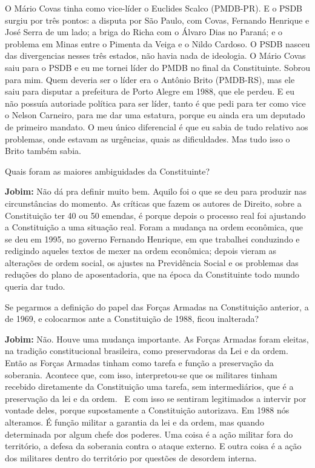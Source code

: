 O Mário Covas tinha como vice-líder o Euclides Scalco (PMDB-PR). E o
PSDB surgiu por três pontos: a disputa por São Paulo, com Covas,
Fernando Henrique e José Serra de um lado; a briga do Richa com o Álvaro
Dias no Paraná; e o problema em Minas entre o Pimenta da Veiga e o Nildo
Cardoso. O PSDB nasceu das divergencias nesses três estados, não havia
nada de ideologia. O Mário Covas saiu para o PSDB e eu me tornei líder
do PMDB no final da Constituinte. Sobrou para mim. Quem deveria ser o
líder era o Antônio Brito (PMDB-RS), mas ele saiu para disputar a
prefeitura de Porto Alegre em 1988, que ele perdeu. E eu não possuía
autoriade política para ser líder, tanto é que pedi para ter como vice o
Nelson Carneiro, para me dar uma estatura, porque eu ainda era um
deputado de primeiro mandato. O meu único diferencial é que eu sabia de
tudo relativo aos problemas, onde estavam as urgências, quais as
dificuldades. Mas tudo isso o Brito também sabia.

Quais foram as maiores ambiguidades da Constituinte?

\textbf{Jobim:} Não dá pra definir muito bem. Aquilo foi o que se deu
para produzir nas circunstâncias do momento. As críticas que fazem os
autores de Direito, sobre a Constituição ter 40 ou 50 emendas, é porque
depois o processo real foi ajustando a Constituição a uma situação real.
Foram a mudança na ordem econômica, que se deu em 1995, no governo
Fernando Henrique, em que trabalhei conduzindo e redigindo aqueles
textos de mexer na ordem econômica; depois vieram as alterações de ordem
social, os ajustes na Previdência Social e os problemas das reduções do
plano de aposentadoria, que na época da Constituinte todo mundo queria
dar tudo.

Se pegarmos a definição do papel das Forças Armadas na Constituição
anterior, a de 1969, e colocarmos ante a Constituição de 1988, ficou
inalterada?

\textbf{Jobim:} Não. Houve uma mudança importante. As Forças Armadas
foram eleitas, na tradição constitucional brasileira, como preservadoras
da Lei e da ordem. Então as Forças Armadas tinham como tarefa e função a
preservação da soberania. Acontece que, com isso, interpretou-se que os
militares tinham recebido diretamente da Constituição uma tarefa, sem
intermediários, que é a preservação da lei e da ordem.~ E com isso se
sentiram legitimados a intervir por vontade deles, porque supostamente a
Constituição autorizava. Em 1988 nós alteramos. É função militar a
garantia da lei e da ordem, mas quando determinada por algum chefe dos
poderes. Uma coisa é a ação militar fora do território, a defesa da
soberania contra o ataque externo. E outra coisa é a ação dos militares
dentro do território por questões de desordem interna.

